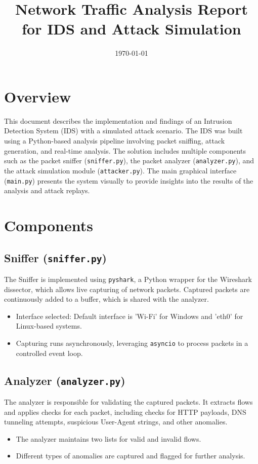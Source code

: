 \documentclass{article}
\title{Network Traffic Analysis Report for IDS and Attack Simulation}
\author{}
\date{\today}
\begin{document}
\maketitle

\section{Overview}

This document describes the implementation and findings of an Intrusion Detection System (IDS) with a simulated attack scenario. The IDS was built using a Python-based analysis pipeline involving packet sniffing, attack generation, and real-time analysis. The solution includes multiple components such as the packet sniffer (\texttt{sniffer.py}), the packet analyzer (\texttt{analyzer.py}), and the attack simulation module (\texttt{attacker.py}). The main graphical interface (\texttt{main.py}) presents the system visually to provide insights into the results of the analysis and attack replays.

\section{Components}

\subsection{Sniffer (\texttt{sniffer.py})}
The Sniffer is implemented using \texttt{pyshark}, a Python wrapper for the Wireshark dissector, which allows live capturing of network packets. Captured packets are continuously added to a buffer, which is shared with the analyzer.
\begin{itemize}
    \item Interface selected: Default interface is 'Wi-Fi' for Windows and 'eth0' for Linux-based systems.
    \item Capturing runs asynchronously, leveraging \texttt{asyncio} to process packets in a controlled event loop.
\end{itemize}

\subsection{Analyzer (\texttt{analyzer.py})}
The analyzer is responsible for validating the captured packets. It extracts flows and applies checks for each packet, including checks for HTTP payloads, DNS tunneling attempts, suspicious User-Agent strings, and other anomalies.
\begin{itemize}
    \item The analyzer maintains two lists for valid and invalid flows.
    \item Different types of anomalies are captured and flagged for further analysis.
\end{itemize}
\end{document}
